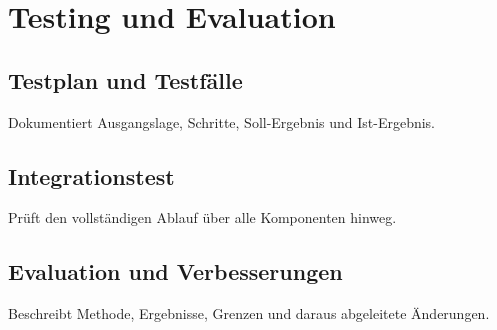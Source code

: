 \chapter{Testing und Evaluation}
\section{Testplan und Testfälle}
Dokumentiert Ausgangslage, Schritte, Soll-Ergebnis und Ist-Ergebnis.
\section{Integrationstest}
Prüft den vollständigen Ablauf über alle Komponenten hinweg.
\section{Evaluation und Verbesserungen}
Beschreibt Methode, Ergebnisse, Grenzen und daraus abgeleitete Änderungen.
